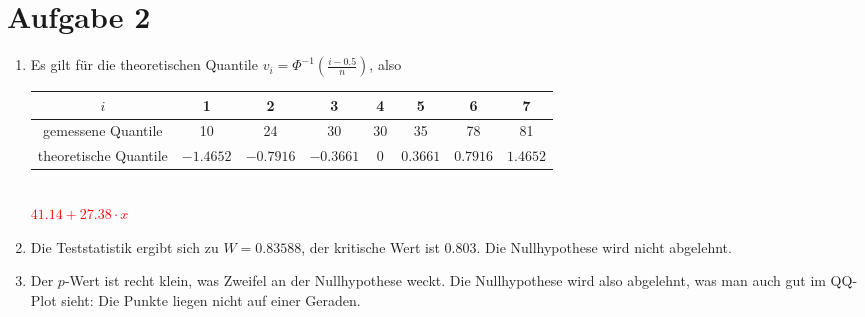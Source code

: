 \documentclass{article}
\begin{document}
	\section*{Aufgabe 2}
	\begin{enumerate}[label=(\alph*)]
		\item Es gilt für die theoretischen Quantile $v_i = \Phi^{-1}\left(\frac{i-0.5}{n}\right)$, also
		\begin{center}
			\begin{tabular}{c|ccccccc}
				$i$ & 1 & 2 & 3 & 4 & 5 & 6 & 7 \\
				\hline
				gemessene Quantile & 10 & 24 & 30 & 30 & 35 & 78 & 81 \\
				theoretische Quantile & $-1.4652$ & $-0.7916$ & $-0.3661$ & 0 & $0.3661$ & $0.7916$ & $1.4652$
			\end{tabular}
		\end{center}
		\begin{center}
			 \\
			\textcolor{red}{$41.14 + 27.38\cdot x$}
		\end{center}
		\item Die Teststatistik ergibt sich zu $W=0.83588$, der kritische Wert ist 0.803. Die Nullhypothese wird nicht abgelehnt.
		\item Der $p$-Wert ist recht klein, was Zweifel an der Nullhypothese weckt. Die Nullhypothese wird also abgelehnt, was man auch gut im QQ-Plot sieht: Die Punkte liegen nicht auf einer Geraden.
	\end{enumerate}
\end{document}
